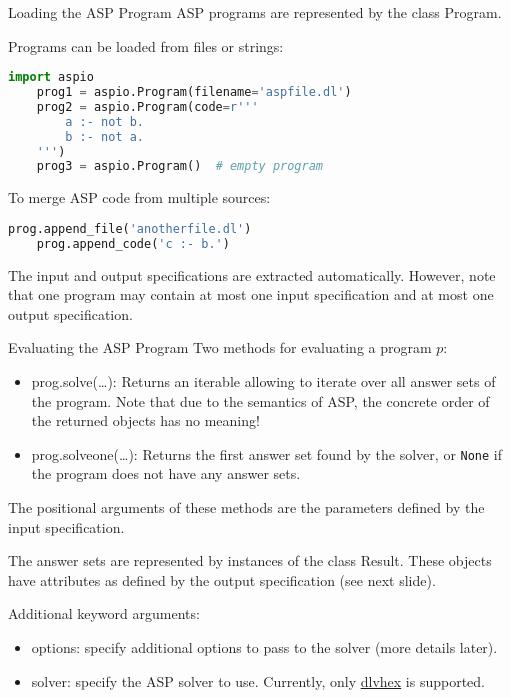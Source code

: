 \documentclass[%
beamer,%
english,%
10pt,%
]{beamer}
\newcommand{\blue}[1]{{\color{blue}#1}}
\begin{document}
\begin{frame}[fragile]{Loading the ASP Program}
    ASP programs are represented by the class \blue{Program}.

    Programs can be loaded from files or strings:
    \begin{lstlisting}[basicstyle=\footnotesize,language=python]
    import aspio
    prog1 = aspio.Program(filename='aspfile.dl')
    prog2 = aspio.Program(code=r'''
        a :- not b.
        b :- not a.
    ''')
    prog3 = aspio.Program()  # empty program
    \end{lstlisting}

    To merge ASP code from multiple sources:
    \begin{lstlisting}[basicstyle=\footnotesize,language=python]
    prog.append_file('anotherfile.dl')
    prog.append_code('c :- b.')
    \end{lstlisting}

    The input and output specifications are extracted automatically.
    However, note that one program may contain \blue{at most one input specification} and \blue{at most one output specification}.
\end{frame}

\begin{frame}{Evaluating the ASP Program}
    Two methods for evaluating a program $p$:
    \begin{itemize}
        \item \blue{prog.solve(\dots)}:
            Returns an iterable allowing to iterate over \blue{all answer sets} of the program.
            Note that due to the semantics of ASP, the concrete order of the returned objects has no meaning!
        \item \blue{prog.solve\textunderscore{}one(\dots)}:
            Returns the \blue{first answer set} found by the solver, or \blue{\lstinline{None}} if the program does not have any answer sets.
    \end{itemize}

    The positional arguments of these methods are the parameters defined by the input specification.

    The answer sets are represented by instances of the class \blue{Result}.
    These objects have attributes as defined by the output specification (see next slide).

    \bigskip
    Additional keyword arguments:
    \begin{itemize}
        \item \blue{options}: specify additional options to pass to the solver (more details later).
        \item \blue{solver}: specify the ASP solver to use. Currently, only \href{http://www.kr.tuwien.ac.at/research/systems/dlvhex/}{dlvhex} is supported.
    \end{itemize}
\end{frame}
\end{document}
